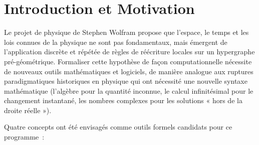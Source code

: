 \documentclass[11pt,a4paper]{article}
\begin{document}
\begin{abstract}
d'une orbite unidimensionnelle lisse et fermée), et aucune des quatre
affirmations de robustesse à la densité n'a survécu à un contrôle
approprié. La preuve la plus solide d'un véritable avantage de
l'estimateur --- une haute précision sur deux cibles bidimensionnelles non
dégénérées où la méthode traditionnelle ne converge jamais --- se situe en
dehors de ce que le critère de victoire déclaré peut noter, et est
rapportée comme l'axe recommandé pour le prochain cycle. Un troisième
cycle a ensuite révisé l'objectif à six sur dix et l'a atteint (01, 02,
03, 04, 06, 10), mais seulement après deux cycles supplémentaires de
réparation de l'estimateur, une boucle d'amélioration fondée sur la
littérature, et une chaîne de relecture à quatre niveaux ayant par deux
fois surpris les \emph{examinateurs} en train d'appliquer une véritable
correction d'équité à seulement une partie des problèmes qu'elle
gouvernait --- la même catégorie d'erreur que la correction du cycle 2
avait elle-même diagnostiquée, désormais confirmée pour affecter les
examinateurs aussi facilement que les affirmations d'origine. Voir la
Section~\ref{sec:cycle3}.
\end{abstract}

\tableofcontents

\section{Introduction et Motivation}

Le projet de physique de Stephen Wolfram propose que l'espace, le temps et
les lois connues de la physique ne sont pas fondamentaux, mais émergent de
l'application discrète et répétée de règles de réécriture locales sur un
hypergraphe pré-géométrique. Formaliser cette hypothèse de façon
computationnelle nécessite de nouveaux outils mathématiques et logiciels,
de manière analogue aux ruptures paradigmatiques historiques en physique
qui ont nécessité une nouvelle syntaxe mathématique (l'algèbre pour la
quantité inconnue, le calcul infinitésimal pour le changement instantané,
les nombres complexes pour les solutions « hors de la droite réelle »).

Quatre concepts ont été envisagés comme outils formels candidats pour ce
programme~:
\end{document}
